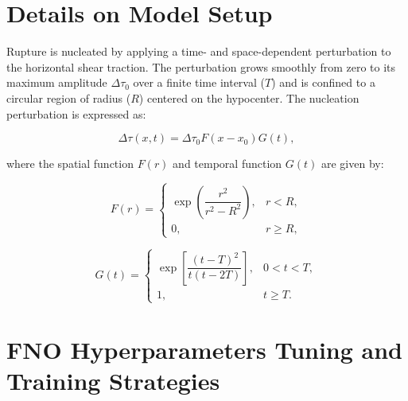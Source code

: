 \documentclass[draft]{agujournal2019}
\begin{document}

\appendix
\section{Details on Model Setup}
\label{sec:appendix_a}

Rupture is nucleated by applying a time- and space-dependent perturbation to the horizontal shear traction. The perturbation grows smoothly from zero to its maximum amplitude \(\Delta \tau_0\) over a finite time interval (\(T\)) and is confined to a circular region of radius (\(R\)) centered on the hypocenter. The nucleation perturbation is expressed as:

\begin{equation}
\Delta \tau(x, t) = \Delta \tau_0 F\left(x - x_0\right) G(t), \label{eq:1}
\end{equation}

where the spatial function \(F(r)\) and temporal function \(G(t)\) are given by:

\begin{equation}
F(r) =
\begin{cases} 
\exp\left(\dfrac{r^2}{r^2 - R^2}\right), & r < R, \\
0, & r \geq R,
\end{cases}
\end{equation}

\begin{equation}
G(t) =
\begin{cases} 
\exp\left[\dfrac{(t - T)^2}{t(t - 2T)}\right], & 0 < t < T, \\
1, & t \geq T.
\end{cases}
\end{equation}

\section{FNO Hyperparameters Tuning and Training Strategies}
\label{sec:appendix_b}
\end{document}
